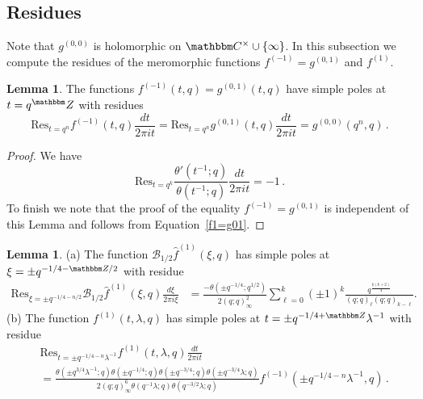 \documentclass[12pt,reqno]{amsart}
\theoremstyle{definition}
\newtheorem{lemma}[theorem]{Lemma}
\def\BZ{\mathbbm Z}
\def\BC{\mathbbm C}
\def\Res{\mathrm{Res}}
\def\be{\begin{equation}}
\def\ee{\end{equation}}
\def\Bor{\mathcal{B}}
\begin{document}
\subsection{Residues}

Note that $g^{(0,0)}$ is holomorphic on $\BC^{\times}\cup\{\infty\}$. In this
subsection we compute the residues of the meromorphic functions $f^{(-1)}=g^{(0,1)}$
and $f^{(1)}$.

\begin{lemma}
  \label{lem.resg01}
  The functions $f^{(-1)}(t,q)=g^{(0,1)}(t,q)$ have simple poles at $t = q^\BZ$ with
  residues
\be
\Res_{t=q^{n}}f^{(-1)}(t,q)\frac{dt}{2\pi i t}
=
\Res_{t=q^{n}}g^{(0,1)}(t,q)\frac{dt}{2\pi i t}
=
g^{(0,0)}(q^{n},q)\,.
\ee
\end{lemma}

\begin{proof}
We have
\be
\Res_{t=q^{k}}\frac{\theta'(t^{-1};q)}{\theta(t^{-1};q)}\frac{dt}{2\pi it}
=
-1 \,.
\ee
To finish we note that the proof of the equality $f^{(-1)}=g^{(0,1)}$ is
independent of this Lemma and follows from Equation~\eqref{f1=g01}.
\end{proof}

\begin{lemma}
  \label{lem.resf1}
  \rm{(a)} The function $\Bor_{1/2}\hat{f}^{(1)}(\xi,q)$ has simple poles at
$\xi=\pm q^{-1/4-\BZ/2}$ with residue
\be
\begin{aligned}
\Res_{\xi=\pm q^{-1/4-n/2}}\Bor_{1/2}\hat{f}^{(1)}(\xi,q)\frac{d\xi}{2\pi i\xi}
&=
\frac{-\theta(\pm q^{-1/4};q^{1/2})}{2(q;q)_{\infty}^{2}}
\sum_{\ell=0}^{k}(\pm1)^{k}\frac{q^{\frac{k(k+2)}{4}}}{(q;q)_{\ell}(q;q)_{k-\ell}}.
\end{aligned}
\ee
  \rm{(b)}
  The function $f^{(1)}(t,\lambda,q)$ has simple poles at
  $t=\pm q^{-1/4+\BZ}\lambda^{-1}$ with residue
  \be
\begin{aligned}
&\Res_{t=\pm q^{-1/4-n}\lambda^{-1}}f^{(1)}(t,\lambda,q)\frac{dt}{2\pi it}\\
&=
\frac{\theta(\pm q^{3/4}\lambda^{-1};q)\theta(\pm q^{-1/4};q)
  \theta(\pm q^{-3/4};q) \theta(\pm q^{-3/4}\lambda;q)}{2(q;q)_{\infty}^{6}
  \theta(q^{-1}\lambda;q)\theta(q^{-3/2}\lambda;q)}
f^{(-1)}(\pm q^{-1/4-n} \lambda^{-1},q) \,.
\end{aligned}
\ee
\end{lemma}
\end{document}
